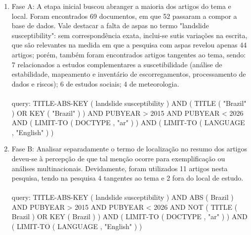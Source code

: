 \documentclass[onecolumn, A4]{article}
\begin{document}
\begin{enumerate}
	\item[a)] Fase A:
A etapa inicial buscou abranger a maioria dos artigos do tema e local. Foram encontrados 69 documentos, em que 52 passaram a compor a base de dados. Vale destacar a falta de aspas no termo "landslide susceptibility": sem correspondência exata, inclui-se sutis variações na escrita, que são relevantes na medida em que a pesquisa com aspas revelou apenas 44 artigos; porém, também foram encontrados artigos tangentes ao tema, sendo: 7 relacionados a estudos complementares a suscetibilidade (análise de estabilidade, mapeamento e inventário de escorregamentos, processamento de dados e riscos); 6 de estudos sociais; 4 de meteorologia. \\ \\
{\small query: TITLE-ABS-KEY ( landslide susceptibility ) AND ( TITLE ( "Brazil" ) OR KEY ( "Brazil" ) ) AND PUBYEAR > 2015 AND PUBYEAR < 2026 AND ( LIMIT-TO ( DOCTYPE , "ar" ) ) AND ( LIMIT-TO ( LANGUAGE , "English" ) ) }

	\item[b)] Fase B:
Analisar separadamente o termo de localização no resumo dos artigos deveu-se à percepção de que tal menção ocorre para exemplificação ou análises multinacionais. Devidamente, foram utilizados 11 artigos nesta pesquisa, tendo na pesquisa 4 tangentes ao tema e 2 fora do local de estudo. \\ \\
{\small query: TITLE-ABS-KEY ( landslide susceptibility ) AND ABS ( Brazil ) AND PUBYEAR > 2015 AND PUBYEAR < 2026 AND NOT ( TITLE ( Brazil ) OR KEY ( Brazil ) ) AND ( LIMIT-TO ( DOCTYPE , "ar" ) ) AND ( LIMIT-TO ( LANGUAGE , "English" ) )}


\end{enumerate}
\end{document}
